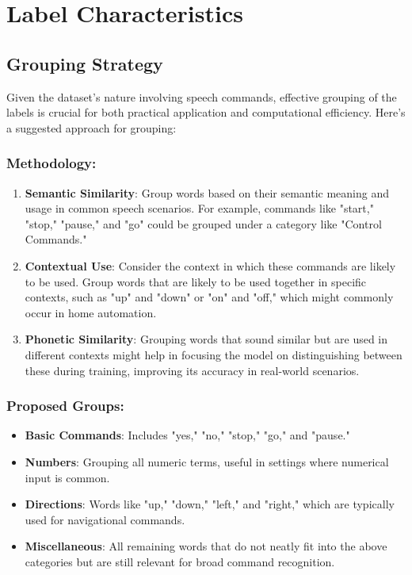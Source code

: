 \section{Label Characteristics}

\subsection{Grouping Strategy}

Given the dataset's nature involving speech commands, effective grouping of the labels is crucial for both practical application and computational efficiency. Here’s a suggested approach for grouping:

\subsubsection{Methodology:}

\begin{enumerate}
    \item \textbf{Semantic Similarity}: Group words based on their semantic meaning and usage in common speech scenarios. For example, commands like "start," "stop," "pause," and "go" could be grouped under a category like "Control Commands."
    \item \textbf{Contextual Use}: Consider the context in which these commands are likely to be used. Group words that are likely to be used together in specific contexts, such as "up" and "down" or "on" and "off," which might commonly occur in home automation.
    \item \textbf{Phonetic Similarity}: Grouping words that sound similar but are used in different contexts might help in focusing the model on distinguishing between these during training, improving its accuracy in real-world scenarios.
\end{enumerate}

\subsubsection{Proposed Groups:}

\begin{itemize}
    \item \textbf{Basic Commands}: Includes "yes," "no," "stop," "go," and "pause."
    \item \textbf{Numbers}: Grouping all numeric terms, useful in settings where numerical input is common.
    \item \textbf{Directions}: Words like "up," "down," "left," and "right," which are typically used for navigational commands.
    \item \textbf{Miscellaneous}: All remaining words that do not neatly fit into the above categories but are still relevant for broad command recognition.
\end{itemize}

